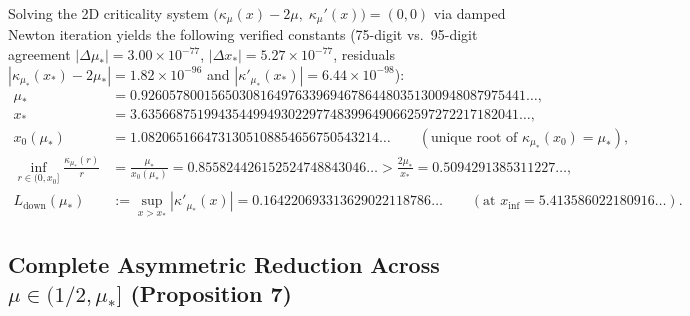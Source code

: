 \documentclass[onecolumn,10pt,notitlepage,amsmath,amssymb,floatfix]{revtex4-2}
\theoremstyle{plain}
\theoremstyle{definition}
\newcommand{\mustar}{\mu_*}
\begin{document}
Solving the 2D criticality system $\big(\kappa_\mu(x) - 2\mu,\; \kappa_\mu'(x)\big) = (0, 0)$ via damped Newton iteration yields the following verified constants (75-digit vs.\ 95-digit agreement $|\Delta\mustar| = 3.00\times 10^{-77}$, $|\Delta x_*| = 5.27\times 10^{-77}$, residuals $|\kappa_{\mustar}(x_*)-2\mustar| = 1.82\times 10^{-96}$ and $|\kappa'_{\mustar}(x_*)| = 6.44\times 10^{-98}$):
\begin{align}
\mustar &= 0.9260578001565030816497633969467864480351300948087975441\dots, \label{eq:S4_mustar_55} \\
x_* &= 3.635668751994354499493022977483996490662597272217182041\dots, \label{eq:S4_xstar_55} \\
x_0(\mustar) &= 1.0820651664731305108854656750543214\dots \qquad (\text{unique root of } \kappa_{\mustar}(x_0) = \mustar), \\
\inf_{r\in(0,x_0]} \frac{\kappa_{\mustar}(r)}{r} &= \frac{\mustar}{x_0(\mustar)} = 0.855824426152524748843046\dots > \frac{2\mustar}{x_*} = 0.5094291385311227\dots, \\
L_{\mathrm{down}}(\mustar) &:= \sup_{x > x_*} |\kappa'_{\mustar}(x)| = 0.164220693313629022118786\dots \qquad (\text{at } x_{\mathrm{inf}} = 5.413586022180916\dots).
\end{align}

\subsection{Complete Asymmetric Reduction Across \texorpdfstring{$\mu \in (1/2, \mustar]$}{mu in (1/2, mu\_*]} (Proposition 7)}
\end{document}
